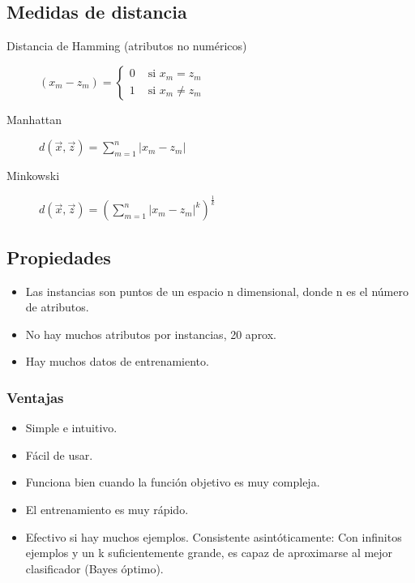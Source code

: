 \documentclass[12pt, twoside, openright]{report} %
\begin{document}
\subsection{Medidas de distancia}
\begin{description}
	\item[Distancia de Hamming (atributos no numéricos)] $\left(x_{m}-z_{m}\right)=\left\{\begin{array}{ll}0 & \text { si } x_{m}=z_{m} \\ 1 & \text { si } x_{m} \neq z_{m}\end{array}\right.$
	\item[Manhattan] $d(\vec{x}, \vec{z})=\sum_{m=1}^{n}\left|x_{m}-z_{m}\right|$
	\item[Minkowski] $d(\vec{x}, \vec{z})=\left(\sum_{m=1}^{n}\left|x_{m}-z_{m}\right|^{k}\right)^{\frac{1}{k}}$
\end{description}

\subsection{Propiedades}
\begin{itemize}
	\item Las instancias son puntos de un espacio n dimensional, donde n es el número de atributos.
	\item No hay muchos atributos por instancias, 20 aprox.
	\item Hay muchos datos de entrenamiento.

\end{itemize}

\subsubsection{Ventajas}
\begin{itemize}
	\item Simple e intuitivo.
	\item Fácil de usar.
	\item Funciona bien cuando la función objetivo es muy compleja.
	\item El entrenamiento es muy rápido.
	\item Efectivo si hay muchos ejemplos. Consistente asintóticamente: Con infinitos ejemplos y un k suficientemente grande, es capaz de aproximarse al mejor clasificador (Bayes óptimo).

\end{itemize}
\end{document}
